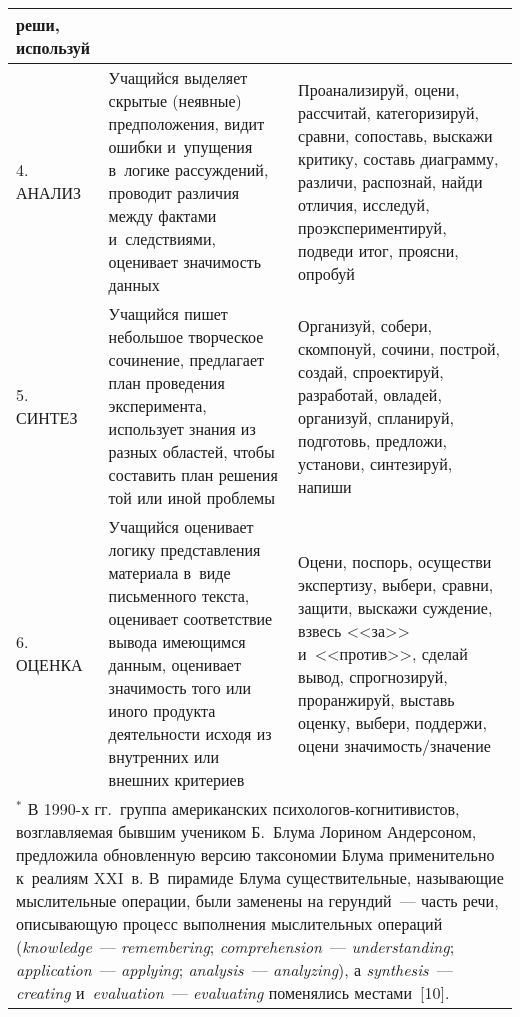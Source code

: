 \begin{table}
\begin{center}
\begin{tabular}{|l|p{60mm}|p{66mm}|}
реши, используй\\
\hline
4. АНАЛИЗ&Учащийся выделяет скрытые (неявные) предположения, видит ошибки и~упущения в~логике рассуждений, проводит различия между фактами и~следствиями, оценивает значимость
данных&Проанализируй, оцени, рассчитай, категоризируй, сравни, сопоставь, выскажи критику, составь
диаграмму, различи, распознай, \mbox{найди} отличия, исследуй, проэкспериментируй, подведи итог, проясни,
опробуй\\
\hline
5. СИНТЕЗ&Учащийся пишет небольшое творческое сочинение, предлагает план проведения
эксперимента, использует знания из разных областей, чтобы составить план решения той или иной
проблемы
&Организуй, собери, скомпонуй, сочини, построй, создай, спроектируй, разработай, овладей, организуй,
спланируй, подготовь, предложи, установи, синтезируй, напиши
\\
\hline
6. ОЦЕНКА&Учащийся оценивает логику представления материала в~виде письменного текста,
оценивает соответствие вывода имеющимся данным, оценивает значимость того или иного продукта
деятельности исходя из внутренних или внешних критериев &Оцени, поспорь, осуществи экспертизу,
выбери, сравни, защити, выскажи суждение, взвесь <<за>> и~<<против>>, сделай вывод, спрогнозируй,
проранжируй, выставь оценку, выбери, поддержи, оцени значимость/значение\\
\hline
\multicolumn{3}{p{160mm}}{\footnotesize $^*$ В 1990-х гг.\ группа американских
пси\-хо\-ло\-гов-когни\-ти\-ви\-стов, возглавляемая бывшим учеником Б.~Блума Лорином Андерсоном,
предложила обновленную версию таксономии Блума применительно к~реалиям XXI~в.
В~пирамиде Блума существительные, называющие мыслительные операции, были заменены на
герундий~--- часть речи, описывающую процесс выполнения мыслительных операций
(\textit{knowledge}~--- \textit{remembering};
\textit{comprehension}~--- \textit{understanding};
\textit{application}~---  \textit{applying};
\textit{analysis}~--- \textit{analyzing}), а
\textit{synthesis}~--- \textit{creating} и~\textit{evaluation}~--- \textit{evaluating} поменялись
местами~[10].}
\end{tabular}
\end{center}
\end{table}


